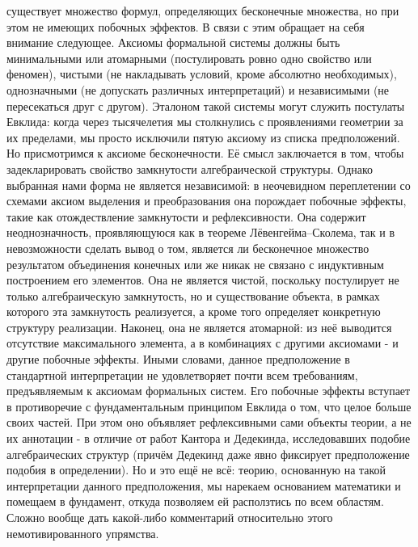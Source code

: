 \documentclass[12pt]{article}
\begin{document}
существует множество формул, определяющих бесконечные множества, но при этом не имеющих побочных эффектов. В связи с этим обращает на себя внимание следующее. Аксиомы формальной системы должны быть минимальными или атомарными (постулировать ровно одно свойство или феномен), чистыми (не накладывать условий, кроме абсолютно необходимых), однозначными (не допускать различных интерпретаций) и независимыми (не пересекаться друг с другом). Эталоном такой системы могут служить постулаты Евклида: когда через тысячелетия мы столкнулись с проявлениями геометрии за их пределами, мы просто исключили пятую аксиому из списка предположений. Но присмотримся к аксиоме бесконечности. Её смысл заключается в том, чтобы задекларировать свойство замкнутости алгебраической структуры. Однако выбранная нами форма не является независимой: в неочевидном переплетении со схемами аксиом выделения и преобразования она порождает побочные эффекты, такие как отождествление замкнутости и рефлексивности. Она содержит неоднозначность, проявляющуюся как в теореме Лёвенгейма–Сколема, так и в невозможности сделать вывод о том, является ли бесконечное множество результатом объединения конечных или же никак не связано с индуктивным построением его элементов. Она не является чистой, поскольку постулирует не только алгебраическую замкнутость, но и существование объекта, в рамках которого эта замкнутость реализуется, а кроме того определяет конкретную структуру реализации. Наконец, она не является атомарной: из неё выводится отсутствие максимального элемента, а в комбинациях с другими аксиомами - и другие побочные эффекты. Иными словами, данное предположение в стандартной интерпретации не удовлетворяет почти всем требованиям, предъявляемым к аксиомам формальных систем. Его побочные эффекты вступает в противоречие с фундаментальным принципом Евклида о том, что целое больше своих частей. При этом оно объявляет рефлексивными сами объекты теории, а не их аннотации - в отличие от работ Кантора и Дедекинда, исследовавших подобие алгебраических структур (причём Дедекинд даже явно фиксирует предположение подобия в определении). Но и это ещё не всё: теорию, основанную на такой интерпретации данного предположения, мы нарекаем основанием математики и помещаем в фундамент, откуда позволяем ей расползтись по всем областям. Сложно вообще дать какой-либо комментарий относительно этого немотивированного упрямства.
\end{document}
